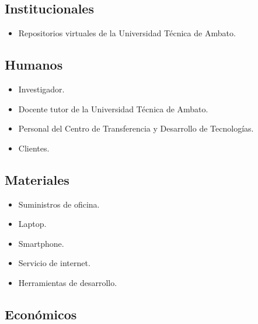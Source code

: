 \subsection{Institucionales}
\begin{itemize}
	\item Repositorios virtuales de la Universidad Técnica de Ambato.
\end{itemize}

\subsection{Humanos}
\begin{itemize}
	\item Investigador.
	\item Docente tutor de la Universidad Técnica de Ambato.
	\item Personal del Centro de Transferencia y Desarrollo de Tecnologías.
	\item Clientes.
\end{itemize}

\subsection{Materiales}
\begin{itemize}
	\item Suministros de oficina.
	\item Laptop.
	\item Smartphone.
	\item Servicio de internet.
	\item Herramientas de desarrollo.
\end{itemize}

\subsection{Económicos}

